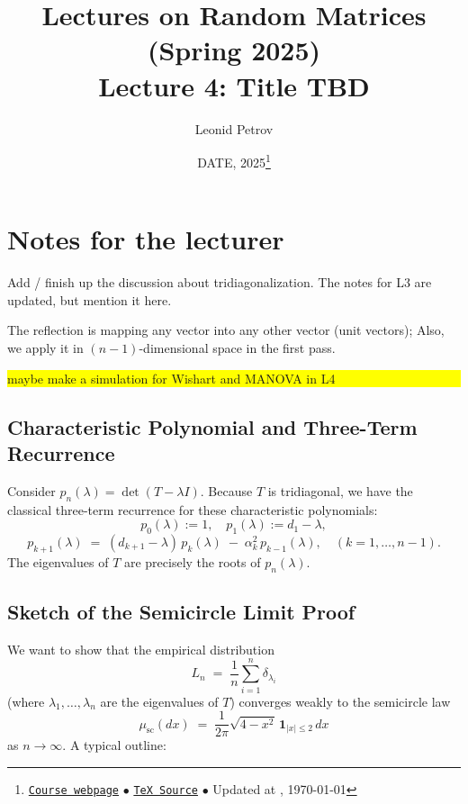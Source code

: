 \documentclass[letterpaper,11pt,oneside,reqno]{article}
\numberwithin{equation}{section}
\theoremstyle{definition}
\newenvironment{lnotes}{\section*{Notes for the lecturer}}{}
\begin{document}
\title{Lectures on Random Matrices
(Spring 2025)
\\Lecture 4: Title TBD}


\date{DATE, 2025\footnote{\href{https://lpetrov.cc/rmt25/}{\texttt{Course webpage}}
$\bullet$ \href{https://lpetrov.cc/rmt25/rmt25-notes/rmt2025-l04.tex}{\texttt{TeX Source}}
$\bullet$
Updated at \currenttime, \today}}



\author{Leonid Petrov}


\maketitle


\begin{lnotes}

	Add / finish up the discussion about tridiagonalization. The notes for L3 are updated, but
	mention it here.

	The reflection is mapping any vector into any other vector (unit vectors);
	Also, we apply it in $(n-1)$-dimensional space in the first pass.


\colorbox{yellow}{\parbox{.7\textwidth}{maybe make a simulation for Wishart and MANOVA in L4}}


\subsection{Characteristic Polynomial and Three-Term Recurrence}

Consider \(p_n(\lambda) = \det(T - \lambda I)\).  Because \(T\) is tridiagonal, we have the classical three-term recurrence for these characteristic polynomials:
\[
  p_0(\lambda) := 1,\quad
  p_1(\lambda) := d_1 - \lambda,
\]
\[
  p_{k+1}(\lambda)
  \;=\;
  (d_{k+1} - \lambda)\,p_k(\lambda)
  \;-\;\alpha_k^2\,p_{k-1}(\lambda),
  \quad
  (k=1,\dots,n-1).
\]
The eigenvalues of \(T\) are precisely the roots of \(p_n(\lambda)\).

\subsection{Sketch of the Semicircle Limit Proof}

We want to show that the empirical distribution
\[
  L_n
  \;=\;
  \frac{1}{n}\sum_{i=1}^n \delta_{\lambda_i}
\]
(where \(\lambda_1,\dots,\lambda_n\) are the eigenvalues of \(T\)) converges weakly to the semicircle law
\[
  \mu_{\mathrm{sc}}(dx)
  \;=\;
  \frac{1}{2\pi}\sqrt{4 - x^2}\,\mathbf{1}_{|x|\le 2}\,dx
\]
as \(n\to\infty\).  A typical outline:


\end{lnotes}
\end{document}
